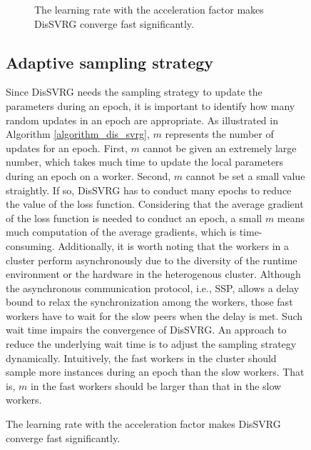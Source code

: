 \documentclass[preprint,review,11pt,a4paper]{elsarticle}
\begin{document}
\begin{figure}
\begin{figure}
\centering
{}
\caption{The learning rate with the acceleration factor makes DisSVRG converge fast significantly.}
\label{figure_evaluation_accelerated_factor}
\end{figure}

\subsection{Adaptive sampling strategy}

Since DisSVRG needs the sampling strategy to update the parameters during an epoch, it is important to identify how many random updates in an epoch are appropriate.  As illustrated in Algorithm \ref{algorithm_dis_svrg}, $m$ represents the number of updates for an epoch. First, $m$ cannot be given an extremely large number, which takes much time to update the local parameters during an epoch on a worker.  Second, $m$ cannot be set a small value straightly. If so, DisSVRG has to conduct many epochs to reduce the value of the loss function. Considering that the average gradient of the loss function is needed to conduct an epoch, a small $m$ means much computation of the average gradients, which is time-consuming.
Additionally, it is worth noting that the workers in a cluster perform asynchronously due to the diversity of the runtime environment or the hardware in the heterogenous cluster.  Although the asynchronous communication protocol, i.e., SSP, allows a delay bound to relax the synchronization among the workers, those fast workers have to wait for the slow peers when the delay is met. Such wait time impairs the convergence of DisSVRG. An approach to reduce the underlying wait time is to adjust the sampling strategy dynamically.  Intuitively, the fast workers in the cluster should sample more instances during an epoch than the slow workers. That is, $m$ in the fast workers should be larger than that in the slow workers.


\end{figure}
\end{document}

